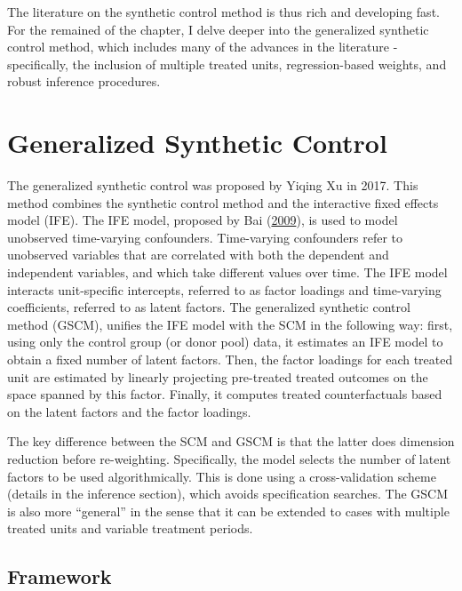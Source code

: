 \documentclass[12pt,nobind, a4paper]{reedthesis}
\begin{document}
 The literature on the synthetic control method is thus rich and developing fast. For the remained of the chapter, I delve deeper into the generalized synthetic control method, which includes many of the advances in the literature - specifically, the inclusion of multiple treated units, regression-based weights, and robust inference procedures.

 \hypertarget{generalized-synthetic-control}{%
 \section{Generalized Synthetic Control}\label{generalized-synthetic-control}}

 The generalized synthetic control was proposed by Yiqing Xu in 2017. This method combines the synthetic control method and the interactive fixed effects model (IFE). The IFE model, proposed by Bai (\protect\hyperlink{ref-bai_panel_2009}{2009}), is used to model unobserved time-varying confounders. Time-varying confounders refer to unobserved variables that are correlated with both the dependent and independent variables, and which take different values over time. The IFE model interacts unit-specific intercepts, referred to as factor loadings and time-varying coefficients, referred to as latent factors. The generalized synthetic control method (GSCM), unifies the IFE model with the SCM in the following way: first, using only the control group (or donor pool) data, it estimates an IFE model to obtain a fixed number of latent factors. Then, the factor loadings for each treated unit are estimated by linearly projecting pre-treated treated outcomes on the space spanned by this factor. Finally, it computes treated counterfactuals based on the latent factors and the factor loadings.
 \linebreak

 The key difference between the SCM and GSCM is that the latter does dimension reduction before re-weighting. Specifically, the model selects the number of latent factors to be used algorithmically. This is done using a cross-validation scheme (details in the inference section), which avoids specification searches. The GSCM is also more ``general'' in the sense that it can be extended to cases with multiple treated units and variable treatment periods.

 \hypertarget{framework}{%
 \subsection{Framework}\label{framework}}
\end{document}
